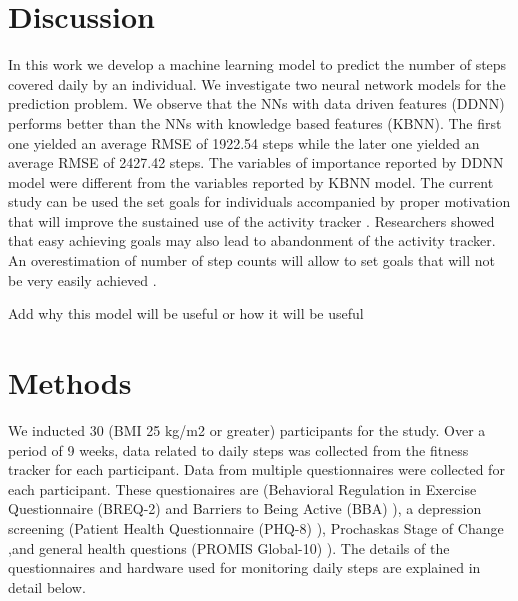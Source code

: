 \documentclass[preprint,12pt]{elsarticle}
\begin{document}
\section{Discussion}
In this work we develop a machine learning model to predict the number of steps covered daily by an individual. We investigate two neural network models for the prediction problem. We observe that the NNs with data driven features (DDNN) performs better than the NNs with knowledge based features (KBNN). The first one yielded an average RMSE of 1922.54 steps while the later one yielded an average RMSE of 2427.42 steps. The variables of importance reported by DDNN model were different from the variables reported by KBNN model. The current study can be used the set goals for individuals accompanied by proper motivation that will improve the sustained use of the activity tracker \cite{couper2010engagement,bossen2013adherence,davies2012prospective}. Researchers showed that easy achieving goals may also lead to abandonment of the activity tracker. An overestimation of number of step counts will allow to set goals that will not be very easily achieved \cite{murnane2015mobile}. 


\color{red}

Add why this model will be useful or how it will be useful 

\color{black}
\section{Methods}

We inducted 30 (BMI 25 kg/m2 or greater) participants for the study. Over a period of 9 weeks, data related to daily steps was collected from the fitness tracker for each participant. Data from multiple questionnaires were collected for each participant. These questionaires are (Behavioral Regulation  in  Exercise  Questionnaire  (BREQ-2) \citep{markland2004modification}  and  Barriers  to  Being  Active  (BBA) \citep{BBA}),  a depression screening (Patient Health Questionnaire (PHQ-8) \citep{kroenke2009phq}), Prochaskas Stage of Change \citep{holmen2016stages},and general health questions (PROMIS Global-10) \citep{hays2009development}). The details of the questionnaires and hardware used for monitoring daily steps are explained in detail below. 
\end{document}
